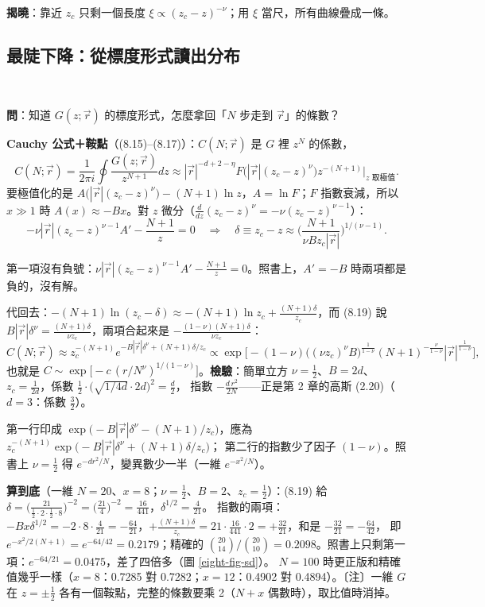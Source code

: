 \textbf{揭曉}：靠近 $z_c$ 只剩一個長度 $\xi\propto(z_c-z)^{-\nu}$；用 $\xi$ 當尺，所有曲線疊成一條。

\subsection{最陡下降：從標度形式讀出分布}
\leavevmode{}\ \par\nopagebreak

\textbf{問}：知道 $G(z;\vec r)$ 的標度形式，怎麼拿回「$N$ 步走到 $\vec r$」的條數？

\textbf{Cauchy 公式＋鞍點}（(8.15)--(8.17)）：$C(N;\vec r)$ 是 $G$ 裡 $z^N$ 的係數，
\[C(N;\vec r)=\frac1{2\pi i}\oint\frac{G(z;\vec r)}{z^{N+1}}dz\approx|\vec r|^{-d+2-\eta}F\big(|\vec r|(z_c-z)^\nu\big)z^{-(N+1)}\Big|_{z\text{ 取極值}} .\tag{8.15, 8.16}\]
要極值化的是 $A\big(|\vec r|(z_c-z)^\nu\big)-(N+1)\ln z$，$A=\ln F$；$F$ 指數衰減，所以 $x\gg1$ 時 $A(x)\approx-Bx$。對 $z$ 微分（$\frac{d}{dz}(z_c-z)^\nu=-\nu(z_c-z)^{\nu-1}$）：
\[-\nu|\vec r|(z_c-z)^{\nu-1}A'-\frac{N+1}z=0\quad\Rightarrow\quad\delta\equiv z_c-z\approx\Big(\frac{N+1}{\nu Bz_c|\vec r|}\Big)^{1/(\nu-1)}.\tag{8.18, 8.19}\]
\begin{errbox}[p.~198，(8.18)]
第一項沒有負號：$\nu|\vec r|(z_c-z)^{\nu-1}A'-\frac{N+1}z=0$。照書上，$A'=-B$ 時兩項都是負的，沒有解。
\end{errbox}
代回去：$-(N+1)\ln(z_c-\delta)\approx-(N+1)\ln z_c+\frac{(N+1)\delta}{z_c}$，而 (8.19) 說 $B|\vec r|\delta^\nu=\frac{(N+1)\delta}{\nu z_c}$，兩項合起來是 $-\frac{(1-\nu)(N+1)\delta}{\nu z_c}$：
\[C(N;\vec r)\approx z_c^{-(N+1)}e^{-B|\vec r|\delta^\nu+(N+1)\delta/z_c}\propto\exp\Big[-(1-\nu)\big((\nu z_c)^\nu B\big)^{\frac1{1-\nu}}(N+1)^{-\frac{\nu}{1-\nu}}|\vec r|^{\frac1{1-\nu}}\Big],\tag{8.20}\]
也就是 $C\sim\exp\big[-c\,(r/N^\nu)^{1/(1-\nu)}\big]$。\textbf{檢驗}：簡單立方 $\nu=\frac12$、$B=2d$、$z_c=\frac1{2d}$，係數 $\frac12\cdot\big(\sqrt{1/4d}\cdot2d\big)^2=\frac d2$，
指數 $-\frac{d\,r^2}{2N}$——正是第 2 章的高斯 (2.20)（$d=3$：係數 $\frac32$）。
\begin{errbox}[p.~198，(8.20)]
第一行印成 $\exp\big(-B|\vec r|\delta^\nu-(N+1)/z_c\big)$，應為 $z_c^{-(N+1)}\exp\big(-B|\vec r|\delta^\nu+(N+1)\delta/z_c\big)$；
第二行的指數少了因子 $(1-\nu)$。照書上 $\nu=\frac12$ 得 $e^{-dr^2/N}$，變異數少一半（一維 $e^{-x^2/N}$）。
\end{errbox}

\textbf{算到底}（一維 $N=20$、$x=8$；$\nu=\frac12$、$B=2$、$z_c=\frac12$）：(8.19) 給 $\delta=\big(\frac{21}{\frac12\cdot2\cdot\frac12\cdot8}\big)^{-2}=\big(\frac{21}4\big)^{-2}=\frac{16}{441}$，$\delta^{1/2}=\frac4{21}$。
指數的兩項：$-B x\delta^{1/2}=-2\cdot8\cdot\frac4{21}=-\frac{64}{21}$，$+\frac{(N+1)\delta}{z_c}=21\cdot\frac{16}{441}\cdot2=+\frac{32}{21}$，和是 $-\frac{32}{21}=-\frac{64}{42}$，
即 $e^{-x^2/2(N+1)}=e^{-64/42}=0.2179$；精確的 $\binom{20}{14}/\binom{20}{10}=0.2098$。照書上只剩第一項：$e^{-64/21}=0.0475$，差了四倍多（圖 \ref{eight-fig-sd}）。
$N=100$ 時更正版和精確值幾乎一樣（$x=8$：0.7285 對 0.7282；$x=12$：0.4902 對 0.4894）。〔注〕一維 $G$ 在 $z=\pm\frac12$ 各有一個鞍點，完整的條數要乘 2（$N+x$ 偶數時），取比值時消掉。

